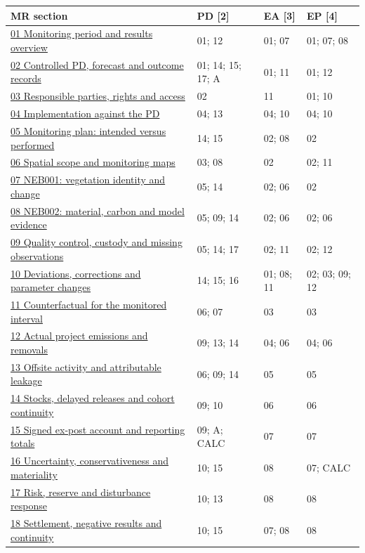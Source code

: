 {\sffamily\fontsize{8.2}{10.2}\selectfont\begin{longtable}{@{}P{83mm}P{26mm}P{24mm}P{24mm}@{}}\toprule
MR section & PD [2] & EA [3] & EP [4]\\\midrule\endhead
\hyperref[mr:01]{01 Monitoring period and results overview} & 01; 12 & 01; 07 & 01; 07; 08\\\hline
\hyperref[mr:02]{02 Controlled PD, forecast and outcome records} & 01; 14; 15; 17; A & 01; 11 & 01; 12\\\hline
\hyperref[mr:03]{03 Responsible parties, rights and access} & 02 & 11 & 01; 10\\\hline
\hyperref[mr:04]{04 Implementation against the PD} & 04; 13 & 04; 10 & 04; 10\\\hline
\hyperref[mr:05]{05 Monitoring plan: intended versus performed} & 14; 15 & 02; 08 & 02\\\hline
\hyperref[mr:06]{06 Spatial scope and monitoring maps} & 03; 08 & 02 & 02; 11\\\hline
\hyperref[mr:07]{07 NEB001: vegetation identity and change} & 05; 14 & 02; 06 & 02\\\hline
\hyperref[mr:08]{08 NEB002: material, carbon and model evidence} & 05; 09; 14 & 02; 06 & 02; 06\\\hline
\hyperref[mr:09]{09 Quality control, custody and missing observations} & 05; 14; 17 & 02; 11 & 02; 12\\\hline
\hyperref[mr:10]{10 Deviations, corrections and parameter changes} & 14; 15; 16 & 01; 08; 11 & 02; 03; 09; 12\\\hline
\hyperref[mr:11]{11 Counterfactual for the monitored interval} & 06; 07 & 03 & 03\\\hline
\hyperref[mr:12]{12 Actual project emissions and removals} & 09; 13; 14 & 04; 06 & 04; 06\\\hline
\hyperref[mr:13]{13 Offsite activity and attributable leakage} & 06; 09; 14 & 05 & 05\\\hline
\hyperref[mr:14]{14 Stocks, delayed releases and cohort continuity} & 09; 10 & 06 & 06\\\hline
\hyperref[mr:15]{15 Signed ex-post account and reporting totals} & 09; A; CALC & 07 & 07\\\hline
\hyperref[mr:16]{16 Uncertainty, conservativeness and materiality} & 10; 15 & 08 & 07; CALC\\\hline
\hyperref[mr:17]{17 Risk, reserve and disturbance response} & 10; 13 & 08 & 08\\\hline
\hyperref[mr:18]{18 Settlement, negative results and continuity} & 10; 15 & 07; 08 & 08\\\hline

\end{longtable}}
